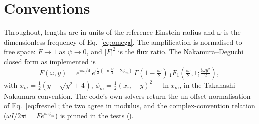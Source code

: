 \documentclass[11pt,a4paper]{article}
\newcommand{\Fresnel}{F}
\newcommand{\ii}{\mathrm{i}}
\begin{document}
\appendix

\section{Conventions}
\label{app:conv}
Throughout, lengths are in units of the reference Einstein radius and
$\omega$ is the dimensionless frequency of Eq.~\eqref{eq:omega}.  The
amplification is normalised to free space: $\Fresnel \to 1$ as $\psi \to
0$, and $|\Fresnel|^2$ is the flux ratio.  The Nakamura--Deguchi closed
form as implemented  is
\begin{equation}
  \Fresnel(\omega,y) = e^{\pi\omega/4}\,
  e^{\ii\frac{\omega}{2}\left(\ln\frac{\omega}{2}-2\phi_m\right)}\,
  \Gamma\!\left(1-\tfrac{\ii\omega}{2}\right)\,
  {}_1F_1\!\left(\tfrac{\ii\omega}{2},1;\tfrac{\ii\omega y^2}{2}\right),
\end{equation}
with $x_m = \tfrac12(y+\sqrt{y^2+4})$, $\phi_m =
\tfrac12(x_m-y)^2 - \ln x_m$, in the Takahashi--Nakamura convention.  The
code's own solvers return the un-offset normalisation of
Eq.~\eqref{eq:fresnel}; the two agree in modulus, and the complex-convention
relation ($\omega I/2\pi\ii = \Fresnel e^{\ii\omega\phi_m}$) is pinned in the
tests ().
\end{document}
